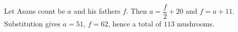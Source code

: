 Let Asan\textquotesingle s count be $a$ and his father\textquotesingle s $f$. Then $a=\dfrac{f}{2}+20$ and $f=a+11$. Substitution gives $a=51$, $f=62$, hence a total of $\boxed{113}$ mushrooms.
